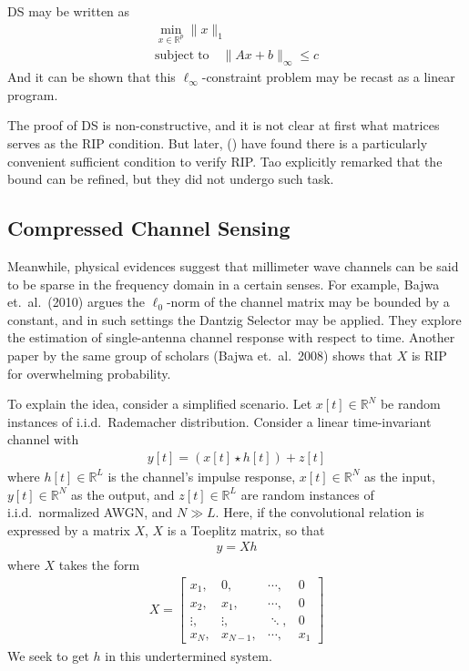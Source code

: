 \documentclass[12pt]{article}
\begin{document}
DS may be written as
\begin{gather*}
\min_{x \in \mathbb{R}^p}  \|x\|_1 \\
\mathrm{subject}\; \mathrm{to} \quad \|Ax+b\|_\infty \leq c
\end{gather*}
And it can be shown that this \(\ell_\infty\)-constraint problem may be recast as a linear program.

The proof of DS is non-constructive, and it is not clear at first what matrices serves as the RIP condition.
But later, () have found there is a particularly convenient sufficient condition to verify RIP.
Tao explicitly remarked that the bound can be refined, but they did not undergo such task.

\subsection{Compressed Channel Sensing}

Meanwhile, physical evidences suggest that millimeter wave channels can be said to be sparse in the frequency domain in a certain senses.
For example, Bajwa et.\ al.\ (2010) argues the \(\ell_0\)-norm of the channel matrix may be bounded by a constant, and in such settings the Dantzig Selector may be applied.
They explore the estimation of single-antenna channel response with respect to time.
Another paper by the same group of scholars (Bajwa et.\ al.\ 2008) shows that \(X\) is RIP for overwhelming probability.

To explain the idea, consider a simplified scenario.
Let \(x[t] \in \mathbb{R}^N\) be random instances of i.i.d.\ Rademacher distribution.
Consider a linear time-invariant channel with
\begin{gather*}
y[t] =(x[t] \star h[t]) +z[t]
\end{gather*}
where \(h[t] \in \mathbb{R}^L\) is the channel's impulse response, \(x[t] \in \mathbb{R}^N\) as the input, \(y[t] \in \mathbb{R}^N\) as the output, and \(z[t] \in \mathbb{R}^L\) are random instances of i.i.d.\ normalized AWGN, and \(N \gg L\).
Here, if the convolutional relation is expressed by a matrix \(X\), \(X\) is a Toeplitz matrix, so that
\begin{gather*}
y =X h
\end{gather*}
where \(X\) takes the form
\begin{align*}
X
=\begin{bmatrix}
x_1, &0, &\cdots, &0 \\
x_2, &x_1, &\cdots, &0 \\
\vdots, &\vdots, &\ddots, &0 \\
x_N, &x_{N-1}, &\cdots, &x_1
\end{bmatrix}
\end{align*}
We seek to get \(h\) in this undertermined system.
\end{document}
